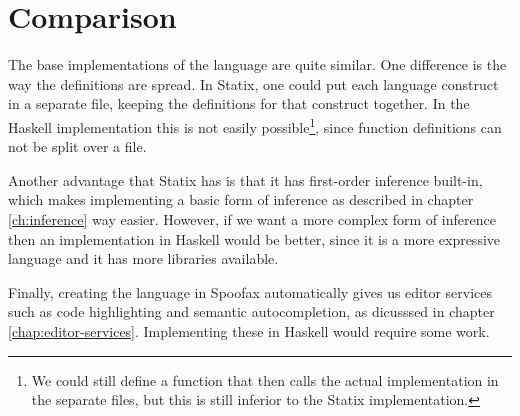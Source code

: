 \section{Comparison}

The base implementations of the language are quite similar. One difference is the way the definitions are spread. In Statix, one could put each language construct in a separate file, keeping the definitions for that construct together. In the Haskell implementation this is not easily possible\footnote{We could still define a function that then calls the actual implementation in the separate files, but this is still inferior to the Statix implementation.}, since function definitions can not be split over a file. 

Another advantage that Statix has is that it has first-order inference built-in, which makes implementing a basic form of inference as described in chapter \ref{ch:inference} way easier. However, if we want a more complex form of inference then an implementation in Haskell would be better, since it is a more expressive language and it has more libraries available. 

Finally, creating the language in Spoofax automatically gives us editor services such as code highlighting and semantic autocompletion, as dicusssed in chapter \ref{chap:editor-services}. Implementing these in Haskell would require some work.
